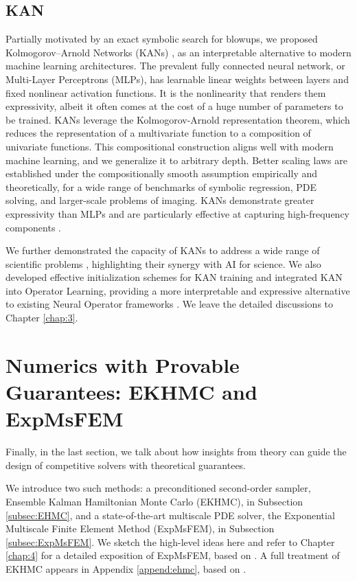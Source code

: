 \documentclass[12pt]{caltech_thesis}
\numberwithin{equation}{section}
\begin{document}
\subsection{KAN}
\label{subsec:kan}
Partially motivated by an exact symbolic search for blowups, we proposed Kolmogorov–Arnold Networks (KANs) \cite{kan1}, as an interpretable alternative to modern machine learning architectures. The prevalent fully connected neural network, or Multi-Layer Perceptrons (MLPs), has learnable linear weights between layers and fixed nonlinear activation functions. It is the nonlinearity that renders them expressivity, albeit it often comes at the cost of a huge number of parameters to be trained. KANs leverage the  Kolmogorov-Arnold representation theorem, which reduces the representation of a multivariate function to a composition of univariate functions. This compositional construction aligns well with modern machine learning, and we generalize it to arbitrary depth. Better scaling laws are established under the compositionally smooth assumption empirically and theoretically, for a wide range of benchmarks of symbolic regression, PDE solving, and larger-scale problems of imaging. KANs demonstrate greater expressivity than MLPs and are particularly effective at capturing high-frequency components \cite{kanbias}. 

We further demonstrated the capacity of KANs to address a wide range of scientific problems \cite{liu2024kan}, highlighting their synergy with AI for science. We also developed effective initialization schemes for KAN training \cite{rigas2025initialization} and integrated KAN into Operator Learning, providing a more interpretable and expressive alternative to existing Neural Operator frameworks \cite{lee2025kano}. We leave the detailed discussions to Chapter \ref{chap:3}.


\section{Numerics with Provable Guarantees: EKHMC and ExpMsFEM}\label{sec:num3}
Finally, in the last section, we talk about how insights from theory can guide the design of competitive solvers with theoretical guarantees.

We introduce two such methods: a preconditioned second-order sampler, Ensemble Kalman Hamiltonian Monte Carlo (EKHMC), in Subsection \ref{subsec:EHMC}, and a state-of-the-art multiscale PDE solver, the Exponential Multiscale Finite Element Method (ExpMsFEM), in Subsection \ref{subsec:ExpMsFEM}.
We sketch the high-level ideas here and refer to Chapter \ref{chap:4} for a detailed exposition of ExpMsFEM, based on \cite{chen2021exponential, chen2023exponentially, chen2024exponentially}. A full treatment of EKHMC appears in Appendix \ref{append:ehmc}, based on \cite{liu2022second}.
\end{document}
